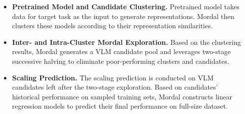 \begin{itemize}
    
    \item \textbf{Pretrained Model and Candidate Clustering.} Pretrained model takes data for target task as the input to generate representations. Mordal then clusters these models according to their representation similarities. 

    \item \textbf{Inter- and Intra-Cluster Mordal Exploration.} Based on the clustering results, Mordal generates a VLM candidate pool and leverages two-stage successive halving to eliminate poor-performing clusters and candidates. 

    \item \textbf{Scaling Prediction.} The scaling prediction is conducted on VLM candidates left after the two-stage exploration. Based on candidates' historical performance on sampled training sets, Mordal constructs linear regression models to predict their final performance on full-size dataset.
\end{itemize}

